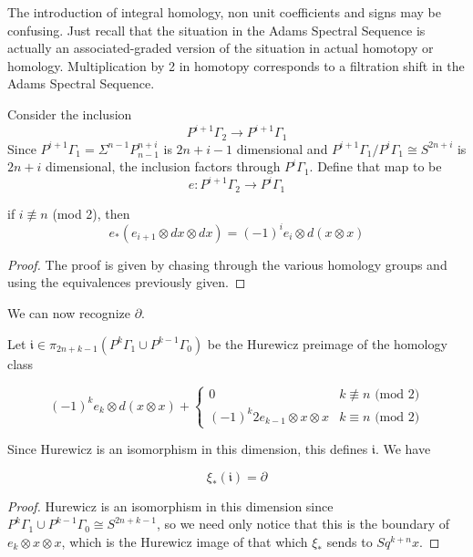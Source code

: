 \begin{Remark}
  \label{sec:assgradrem}
  The introduction of integral homology, non unit coefficients and signs may be confusing.
  Just recall that the situation in the Adams Spectral Sequence is actually an associated-graded version of the situation in actual homotopy or homology.
  Multiplication by 2 in homotopy corresponds to a filtration shift in the Adams Spectral Sequence.  
\end{Remark}

Consider the inclusion
\[P^{i+1}\Gamma_2\to P^{i+1}\Gamma_1\]
Since  $P^{i+1}\Gamma_1=\Sigma^{n-1}P^{n+i}_{n-1}$ is $2n+i-1$ dimensional and 
$P^{i+1}\Gamma_1/P^{i}\Gamma_1\cong S^{2n+i}$ is $2n+i$ dimensional, the inclusion factors through $P^i\Gamma_1$.  
Define that map to be 
\[e:P^{i+1}\Gamma_2\to P^i\Gamma_1\]
\begin{Lemma}
  \label{sec:e_hom_lem}
  if $i\not\equiv n$ (mod 2), then
  \[e_*(e_{i+1}\otimes dx\otimes dx) = (-1)^ie_i\otimes d(x\otimes x)\]
\end{Lemma}

\begin{proof}
  The proof is given by chasing through the various homology groups and using the equivalences previously given.  
\end{proof}

We can now recognize $\partial$.
\begin{Lemma}
  \label{sec:ilem}
  Let $\mathfrak{i}\in \pi_{2n+k-1}(P^k\Gamma_1\cup P^{k-1}\Gamma_0)$ be the Hurewicz preimage of the homology class

  \[(-1)^ke_k\otimes d(x\otimes x) + \left\{\begin{array}{cc} 
  0 & k\not\equiv n\mbox{ (mod 2)}\\
  (-1)^k2e_{k-1}\otimes x\otimes x & k\equiv n\mbox{ (mod 2)}\end{array}\right.\]

  Since Hurewicz is an isomorphism in this dimension, this defines $\mathfrak{i}$.  We have

  \[\xi_*(\mathfrak{i}) = \partial\]
\end{Lemma}

\begin{proof}
  Hurewicz is an isomorphism in this dimension since $P^k\Gamma_1\cup P^{k-1}\Gamma_0\cong S^{2n+k-1}$, so we need only notice that this is the boundary of $e_k\otimes x\otimes x$, which is the Hurewicz image of that which $\xi_*$ sends to $Sq^{k+n}x$.  
\end{proof}


